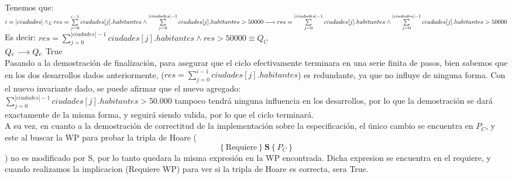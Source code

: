 \documentclass[10pt,a4paper]{article}
\begin{document}
Tenemos que: 
$i = |ciudades| \land _L res = \sum\limits_{j=0}^{i-1} ciudades[j].habitantes \land \sum\limits_{j=0}^{|ciudades| -1} ciudades[j].habitantes > 50000 \longrightarrow  res = \sum\limits_{j=0}^{|ciudades|-1} ciudades[j].habitantes \land \sum\limits_{j=0}^{|ciudades| -1} ciudades[j].habitantes > 50000$ \\

Es decir: 
$res = \sum\limits_{j=0}^{|ciudades|-1} ciudades[j].habitantes \land res > 50000 \equiv Q_C$ \\

$Q_c \longrightarrow Q_c$ \equiv True\\


Pasando a la demostración de finalización, para asegurar que el ciclo efectivamente terminara en una serie finita de pasos, bien sabemos que en los dos desarrollos dados anteriormente, ($ res = \sum\limits_{j=0}^{i-1} ciudades[j].habitantes $) es redundante, ya que no influye de ninguna forma. Con el nuevo invariante dado, se puede afirmar que el nuevo agregado: \\ 

$\sum\limits_{j=0}^{|ciudades|-1} ciudades[j].habitantes > $50.000$ $ tampoco tendrá ninguna influencia en los desarrollos, por lo que la demostración se dará exactamente de la misma forma, y seguirá siendo valida, por lo que el ciclo terminará. \\

A su vez, en cuanto a la demostración de correctitud de la implementación sobre la especificación, el único cambio se encuentra en $P_C$, y este al buscar la WP para probar la tripla de Hoare (\[
\left\{\text{Requiere}\right\} \mathbf{S} \left\{P_C\right\}
\]) no es modificado por S, por lo tanto quedara la misma expresión en la WP encontrada. Dicha expresion se encuentra en el requiere, y cuando realizamos la implicacion (Requiere \implica WP) para ver si la tripla de Hoare es correcta, sera True.
\end{document}
